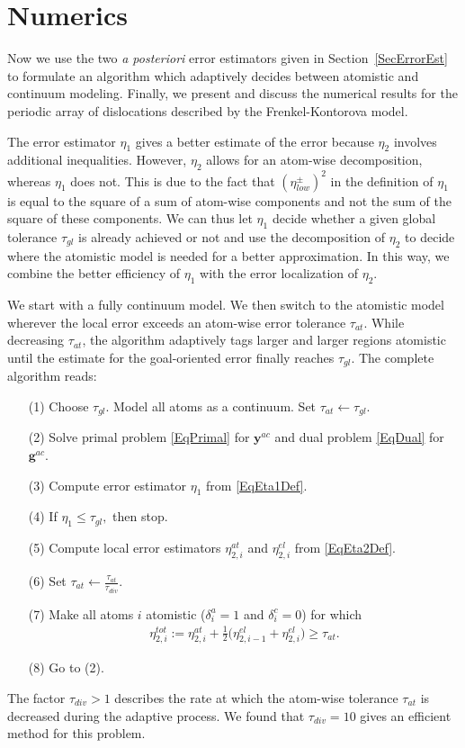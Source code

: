 \documentclass[11pt,reqno,oneside]{amsart}
\numberwithin{equation}{section}
\begin{document}
     

\section{Numerics}  \label{SecNumerics}

Now we use the two {\em a posteriori} error estimators given in
Section~\ref{SecErrorEst} to formulate an algorithm which
adaptively decides between atomistic and continuum modeling.
Finally, we present and discuss the numerical results for the periodic
array of dislocations described by the Frenkel-Kontorova model.

The error estimator $\eta_1$ gives a better estimate of the error because
$\eta_2$ involves additional inequalities. However, $\eta_2$ allows for an
atom-wise decomposition, whereas $\eta_1$ does not. This is due to the fact that
$(\eta_{low}^\pm)^2$ in the definition of $\eta_1$ is equal to the square of a
sum of atom-wise components and not the sum of the square of these components.
We can thus
let $\eta_1$ decide whether a given global tolerance $\tau_{gl}$ is already
achieved or not and use the decomposition of $\eta_2$ to decide where
the atomistic model is needed for a better approximation.  In this way, we combine
the better efficiency of $\eta_1$ with the error localization of $\eta_2$.

We start with a fully continuum model.  We then switch to the atomistic model
wherever the local error exceeds an atom-wise error tolerance $\tau_{at}$.
While decreasing $\tau_{at}$, the algorithm adaptively tags larger and larger
regions atomistic until the estimate for the goal-oriented error finally reaches $\tau_{gl}$.
The complete algorithm reads:
\begin{enumerate}
\item[(1)] Choose $\tau_{gl}$. Model all atoms as a continuum. Set $\tau_{at} \leftarrow \tau_{gl}$.
\item[(2)] Solve primal problem \eqref{EqPrimal} for ${\mathbf{y}}^{ac}$ and dual problem
           \eqref{EqDual} for ${\mathbf{g}}^{ac}$.
\item[(3)] Compute error estimator $\eta_1$ from \eqref{EqEta1Def}.
\item[(4)] If $\eta_1 \le \tau_{gl},$ then stop.
\item[(5)] Compute local error estimators $\eta_{2,i}^{at}$ and $\eta_{2,i}^{el}$
           from \eqref{EqEta2Def}.
\item[(6)] Set $\tau_{at} \leftarrow \frac{\tau_{at}}{\tau_{div}}$.
\item[(7)] Make all atoms $i$ atomistic ($\delta^a_i=1$ and $\delta^c_i=0$) for which
  \begin{align} \label{EqAdaptCrit}
    \eta_{2,i}^{tot}:=\eta_{2,i}^{at} + {{\textstyle \frac{1}{2}}} \big( \eta_{2,i-1}^{el} + \eta_{2,i}^{el} \big) \ge \tau_{at}.
  \end{align}
\item[(8)] Go to (2).
\end{enumerate}
The factor $\tau_{div}>1$ describes the rate at which the atom-wise tolerance $\tau_{at}$
is decreased during the adaptive process. We found that $\tau_{div}=10$ gives an
efficient method for this problem.
\end{document}
